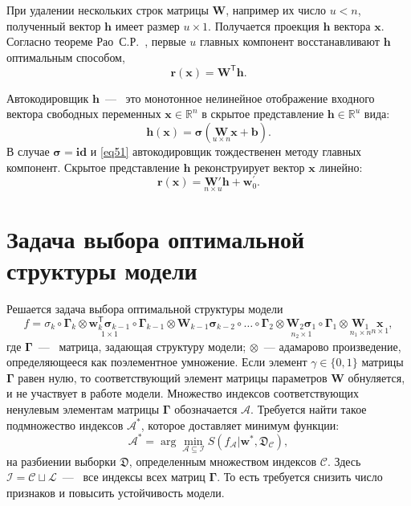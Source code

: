 \documentclass[12pt, twoside]{article}
\newcommand{\sigmab}{{\boldsymbol{\sigma}}}
\newenvironment{comment}{}{}
\newcommand{\x}{{\mathbf{x}}}
\newcommand{\w}{{\mathbf{W}}}
\newcommand{\wm}{{\mathbf{w}}}
\begin{document}
\begin{comment}
При удалении нескольких строк матрицы $\w$, например их число $u < n$,  полученный вектор $\mathbf{h}$ имеет размер $u \times 1$. Получается проекция $\mathbf{h}$ вектора $\mathbf{x}$. Согласно теореме Рао~С.Р.~\cite{fourth}, первые $u$ главных компонент восстанавливают $\mathbf{h}$ оптимальным способом,
\begin{equation}\label{eq45}
\textbf{r}(\textbf{x}) = \w^{\mathsf{T}}\mathbf{h}.
\end{equation}

Автокодировщик $\mathbf{h}$~---~ это монотонное нелинейное отображение входного вектора свободных переменных $\textbf{x} \in \mathbb{R}^n$ в скрытое представление $\mathbf{h} \in \mathbb{R}^{u}$ вида:
\begin{equation}\label{eq52}
\mathbf{h}(\x) = \sigmab(\underset{u \times n}{\w}\x + \mathbf{b}) .
\end{equation}
В случае $\sigmab = \textbf{id}$ и \eqref{eq51} автокодировщик тождественен методу главных компонент. Скрытое представление $\textbf{h}$ реконструирует вектор $\textbf{x}$ линейно:
\begin{equation}\label{eq53}
\mathbf{r}(\x) = \underset{n \times u}{\w{'}}\mathbf{h} + \wm_{0}^{'} .
\end{equation}


\section{Задача выбора оптимальной структуры модели}

Решается задача выбора оптимальной структуры модели
\begin{equation}\label{eq57}
f = \sigma_k\circ\boldsymbol{\Gamma}_k\otimes\underset{1\times1}{\wm_k^\mathsf{T}\sigmab_{k-1}}\circ\boldsymbol{\Gamma}_{k-1}\otimes\w_{k-1}\sigmab_{k-2}\circ\dots\circ\boldsymbol{\Gamma}_2\otimes\underset{n_2 \times 1}{\w_2\sigmab_1}\circ\boldsymbol{\Gamma}_1\otimes\underset{n_1 \times n}{\w_1}\underset{n \times 1}{\x},
\end{equation}
где $\boldsymbol{\Gamma}$~---~ матрица, задающая структуру модели; $\otimes$~--- адамарово произведение, определяющееся как поэлементное умножение. Если элемент $\gamma\in\{0,1\}$ матрицы $\boldsymbol{\Gamma}$ равен нулю, то соответствующий элемент матрицы параметров $\w$ обнуляется, и не участвует в работе модели. Множество индексов соответствующих ненулевым элементам матрицы $\boldsymbol{\Gamma}$ обозначается $\mathcal{A}$.  Требуется найти такое подмножество индексов $\mathcal{A}^{*}$, которое доставляет минимум функции:
\begin{equation}\label{eq46}
\mathcal{A}^{*} = \arg \underset{\mathcal{A} \subseteq \mathcal{I}}\min S(f_{\mathcal{A}}|\wm^*, \mathfrak{D}_\mathcal{C}),
\end{equation}
на разбиении выборки $\mathfrak{D}$, определенным множеством индексов $\mathcal{C}$. Здесь $\mathcal{I} = \mathcal{C}\sqcup \mathcal{L}$~---~ все индексы всех матриц $\boldsymbol{\Gamma}$. То есть требуется снизить число признаков и повысить устойчивость модели.


\end{comment}
\end{document}
